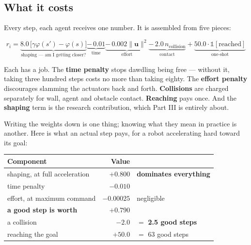 \documentclass[11pt,a4paper]{article}
\newcommand{\bu}{\mathbf{u}}
\begin{document}
\subsection{What it costs}

Every step, each agent receives one number. It is assembled from five pieces:

\begin{equation}
\label{eq:reward}
r_i =
\underbrace{8.0\,\big[\gamma\varphi(s') - \varphi(s)\big]}_{\text{shaping --- am I getting closer?}}
\underbrace{-\,0.01}_{\text{time}}
\underbrace{-\,0.002\|\bu\|^2}_{\text{effort}}
\underbrace{-\,2.0\,n_{\text{collision}}}_{\text{contact}}
+\underbrace{50.0\cdot\mathbb 1[\text{reached}]}_{\text{one-shot}}
\end{equation}

Each has a job. The \textbf{time penalty} stops dawdling being free --- without it, taking
three hundred steps costs no more than taking eighty. The \textbf{effort penalty} discourages
slamming the actuators back and forth. \textbf{Collisions} are charged separately for wall,
agent and obstacle contact. \textbf{Reaching} pays once. And the \textbf{shaping} term is the
research contribution, which Part III is entirely about.

Writing the weights down is one thing; knowing what they mean in practice is another. Here is
what an actual step pays, for a robot accelerating hard toward its goal:

\begin{center}
\small
\begin{tabular}{lrl}
\toprule
\textbf{Component} & \textbf{Value} & \\
\midrule
shaping, at full acceleration & $+0.800$ & \textbf{dominates everything} \\
time penalty                  & $-0.010$ & \\
effort, at maximum command    & $-0.00025$ & negligible \\
\midrule
\textbf{a good step is worth}  & $\mathbf{+0.790}$ & \\
\midrule
a collision                    & $-2.0$  & $=$ \textbf{2.5 good steps} \\
reaching the goal              & $+50.0$ & $=$ $63$ good steps \\
\bottomrule
\end{tabular}
\end{center}
\end{document}
